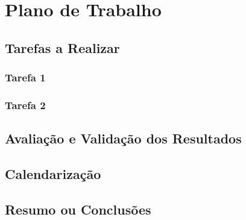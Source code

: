 
\chapter{Plano de Trabalho}\label{chap:chap4}

\section*{}


\section{Tarefas a Realizar} %
\label{sec:tarefas}

  \subsection{Tarefa 1} %
  \label{sub:tarefa_1}
  

  \subsection{Tarefa 2} %
  \label{sub:tarefa_2}
  


\section{Avaliação e Validação dos Resultados} %
\label{sec:avaliacao}


\section{Calendarização} %
\label{sec:calendarizacao}


\section{Resumo ou Conclusões}

\lipsum[1]
